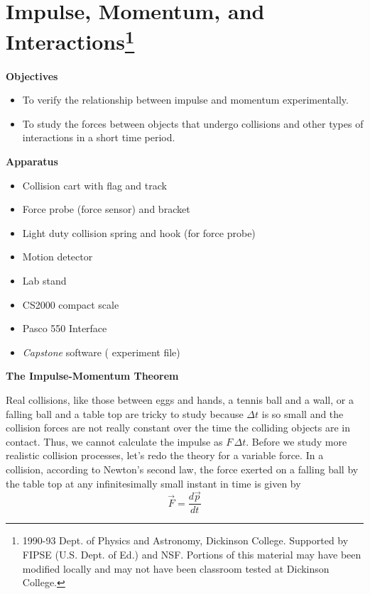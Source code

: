 
\section{Impulse, Momentum, and Interactions\footnote{
1990-93 Dept. of Physics and Astronomy, Dickinson College. Supported by FIPSE
(U.S. Dept. of Ed.) and NSF. Portions of this material may have been modified
locally and may not have been classroom tested at Dickinson College.
}}

\makelabheader %

\textbf{Objectives }

\begin{itemize}
\item To verify the relationship between impulse and momentum experimentally. 
\item To study the forces between objects that undergo collisions and other types of interactions in a short time period.
\end{itemize}
\textbf{Apparatus} 

\begin{itemize}
\item Collision cart with flag and track 
\item Force probe (force sensor) and bracket
\item Light duty collision spring and hook (for force probe)
\item Motion detector
\item Lab stand
\item CS2000 compact scale
\item Pasco 550 Interface
\item \textit{Capstone} software ( experiment file)
\end{itemize}
\textbf{The Impulse-Momentum Theorem }

Real collisions, like those between eggs and hands, a tennis ball and a wall, or
a falling ball and a table top are tricky to study because $\Delta t$ 
is so small and
the collision forces are not really constant over the time the colliding objects
are in contact. Thus, we cannot calculate the impulse as $F \,\Delta t$. 
Before we study
more realistic collision processes, let's redo the theory for a variable force.
In a collision, according to Newton's second law, the force exerted on a falling
ball by the table top at any infinitesimally small instant in time is given
by
\begin{equation}
{\vec  F}=\frac{d{\vec  p}}{dt}
\end{equation}

